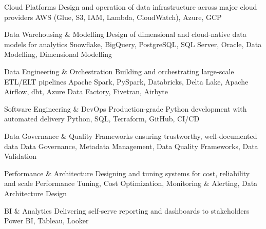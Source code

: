 

\begin{cvskillsnoncentered}

  \cvskill
{Cloud Platforms}
{Design and operation of data infrastructure across major cloud providers}
\cvskill
{}
{AWS (Glue, S3, IAM, Lambda, CloudWatch), Azure, GCP}

\cvskill
{Data Warehousing \& Modelling}
{Design of dimensional and cloud-native data models for analytics}
\cvskill
{}
{Snowflake, BigQuery, PostgreSQL, SQL Server, Oracle, Data Modelling, Dimensional Modelling}

\cvskill
{Data Engineering \& Orchestration}
{Building and orchestrating large-scale ETL/ELT pipelines}
\cvskill
{}
{Apache Spark, PySpark, Databricks, Delta Lake, Apache Airflow, dbt, Azure Data Factory, Fivetran, Airbyte}

\cvskill
{Software Engineering \& DevOps}
{Production-grade Python development with automated delivery}
\cvskill
{}
{Python, SQL, Terraform, GitHub, CI/CD}

\cvskill
{Data Governance \& Quality}
{Frameworks ensuring trustworthy, well-documented data}
\cvskill
{}
{Data Governance, Metadata Management, Data Quality Frameworks, Data Validation}

\cvskill
{Performance \& Architecture}
{Designing and tuning systems for cost, reliability and scale}
\cvskill
{}
{Performance Tuning, Cost Optimization, Monitoring \& Alerting, Data Architecture Design}

\cvskill
{BI \& Analytics}
{Delivering self-serve reporting and dashboards to stakeholders}
\cvskill
{}
{Power BI, Tableau, Looker}
\end{cvskillsnoncentered}
